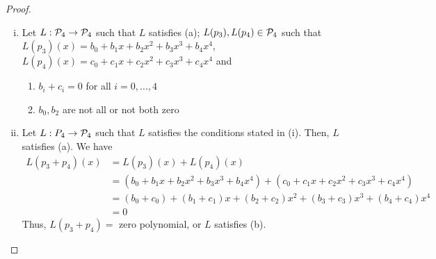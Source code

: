 \begin{proof}
    \renewcommand{\qedsymbol}{$\blacksquare$}
    \begin{enumerate}[(i)]
        \item Let $L:\P_4\rightarrow\P_4$ such that $L$ satisfies (a); $L(p_3), L(p_4)\in\P_4$ such that $L(p_3)(x)=b_0+b_1x+b_2x^2+b_3x^3+b_4x^4$, $L(p_4)(x)=c_0+c_1x+c_2x^2+c_3x^3+c_4x^4$ and
        \begin{enumerate}[(1)]
            \item $b_i+c_i=0$ for all $i=0,...,4$
            \item $b_0,b_2$ are not all or not both zero
        \end{enumerate}
        \item Let $L:P_4\rightarrow\P_4$ such that $L$ satisfies the conditions stated in (i). Then, $L$ satisfies (a).
        We have 
        \[
            \begin{aligned}
                L(p_3+p_4)(x) &= L(p_3)(x)+L(p_4)(x)\\
                &= (b_0+b_1x+b_2x^2+b_3x^3+b_4x^4)+(c_0+c_1x+c_2x^2+c_3x^3+c_4x^4)\\
                &= (b_0+c_0)+(b_1+c_1)x+(b_2+c_2)x^2+(b_3+c_3)x^3+(b_4+c_4)x^4\\
                &= 0
            \end{aligned}
        \]
        Thus, $L(p_3+p_4)=$ zero polynomial, or $L$ satisfies (b).
        

\end{enumerate}
\end{proof}
